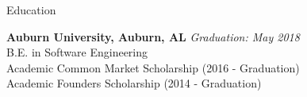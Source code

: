 \documentclass{resume} %
\begin{document}

\begin{rSection}{Education}

{\bf Auburn University, Auburn, AL} \hfill {\em Graduation: May 2018} \\ 
B.E. in Software Engineering \\
Academic Common Market Scholarship (2016 - Graduation) \\
Academic Founders Scholarship (2014 - Graduation)\\

\end{rSection}

\end{document}
